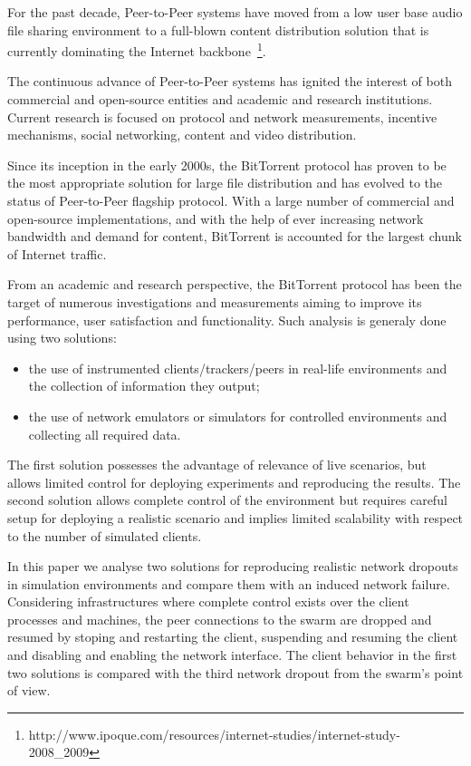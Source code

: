 For the past decade, Peer-to-Peer systems have moved from a low user base
audio file sharing environment to a full-blown content distribution solution
that is currently dominating the Internet
backbone~\footnote{http://www.ipoque.com/resources/internet-studies/internet-study-2008\_2009}.

The continuous advance of Peer-to-Peer systems has ignited the interest of
both commercial and open-source entities and academic and research
institutions. Current research is focused on protocol and network
measurements, incentive mechanisms, social networking, content and video
distribution.

Since its inception in the early 2000s, the BitTorrent protocol has proven to
be the most appropriate solution for large file distribution and has evolved
to the status of Peer-to-Peer flagship protocol. With a large number of
commercial and open-source implementations, and with the help of ever
increasing network bandwidth and demand for content, BitTorrent is accounted
for the largest chunk of Internet traffic.

From an academic and research perspective, the BitTorrent protocol has been
the target of numerous investigations and measurements aiming to improve its
performance, user satisfaction and functionality. Such analysis is generaly
done using two solutions:
\begin{itemize}
  \item the use of instrumented clients/trackers/peers in real-life
  environments and the collection of information they output;
  \item the use of network emulators or simulators for controlled environments
  and collecting all required data.
\end{itemize}
The first solution possesses the advantage of relevance of live scenarios, but
allows limited control for deploying experiments and reproducing the results.
The second solution allows complete control of the environment but requires
careful setup for deploying a realistic scenario and implies limited
scalability with respect to the number of simulated clients.

In this paper we analyse two solutions for reproducing realistic network
dropouts in simulation environments and compare them with an induced network
failure. Considering infrastructures where complete control exists over the
client processes and machines, the peer connections to the swarm are dropped
and resumed by stoping and restarting the client, suspending and resuming the
client and disabling and enabling the network interface. The client behavior
in the first two solutions is compared with the third network dropout from the
swarm's point of view.


